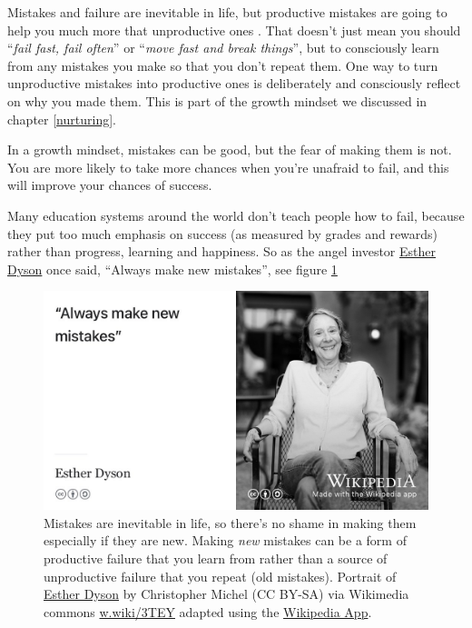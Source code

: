 \documentclass[
]{book}
\begin{document}
Mistakes and failure are inevitable in life, but productive mistakes are going to help you much more that unproductive ones \citep{henrypetroski}. That doesn't just mean you should ``\emph{fail fast, fail often}'' \citep{failfast} or ``\emph{move fast and break things}'', but to consciously learn from any mistakes you make so that you don't repeat them. One way to turn unproductive mistakes into productive ones is deliberately and consciously reflect on why you made them. This is part of the growth mindset we discussed in chapter \ref{nurturing}.

In a growth mindset, mistakes can be good, but the fear of making them is not. You are more likely to take more chances when you're unafraid to fail, and this will improve your chances of success.

Many education systems around the world don't teach people how to fail, because they put too much emphasis on success (as measured by grades and rewards) rather than progress, learning and happiness. \citep{failgift, punished} So as the angel investor \href{https://en.wikipedia.org/wiki/Esther_Dyson}{Esther Dyson} once said, ``Always make new mistakes'', see figure \ref{fig:esther-dyson-fig}

\begin{figure}

{\centering \includegraphics[width=1\linewidth]{images/esther-dyson-always-make-new-mistakes} 

}

\caption{Mistakes are inevitable in life, so there's no shame in making them especially if they are new. Making \emph{new} mistakes can be a form of productive failure that you learn from rather than a source of unproductive failure that you repeat (old mistakes). Portrait of \href{https://en.wikipedia.org/wiki/Esther_Dyson}{Esther Dyson} by Christopher Michel (CC BY-SA) via Wikimedia commons \href{https://w.wiki/3TEY}{w.wiki/3TEY} adapted using the \href{https://apps.apple.com/gb/app/wikipedia/id324715238}{Wikipedia App}.}\label{fig:esther-dyson-fig}
\end{figure}
\end{document}
